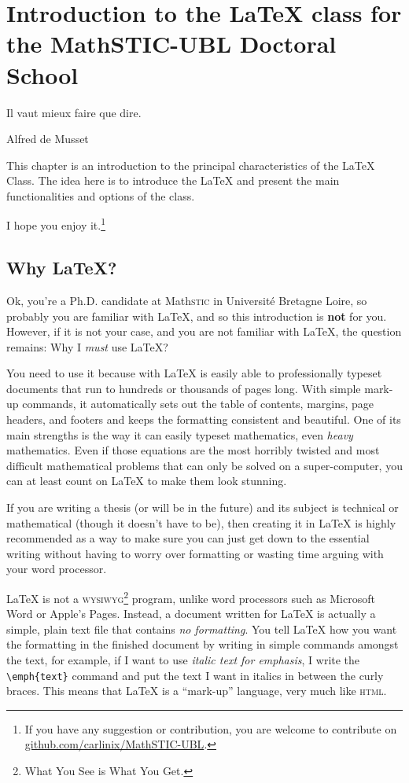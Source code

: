 \chapter{Introduction to the \LaTeX{} class for the MathSTIC-UBL Doctoral School}\label{chap:intro}

\epigraph{Il vaut mieux faire que dire.}{Alfred de Musset}
\minitoc%

This chapter is an introduction to the principal characteristics of the \ublmstic{} \LaTeX{} Class. 
The idea here is to introduce the \LaTeX{} and present the main functionalities and options of the class.


I hope you enjoy it.\footnote{If you have any suggestion or contribution, you are welcome to contribute on \url{github.com/carlinix/MathSTIC-UBL}.}

\section{Why \LaTeX?}\label{sec:why}
Ok, you're a Ph.D. candidate at Math\textsc{stic} in Université Bretagne Loire, so probably you are familiar with \LaTeX{}, and so this introduction is \textbf{not} for you.
However,  if it is not your case, and you are not familiar with \LaTeX{}, the question remains: Why I \emph{must} use \LaTeX\@?

You need to use it because with \LaTeX{} is easily able to professionally typeset documents that run to hundreds or thousands of pages long. 
With simple mark-up commands, it automatically sets out the table of contents, margins, page headers, and footers and keeps the formatting consistent and beautiful. 
One of its main strengths is the way it can easily typeset mathematics, even \emph{heavy} mathematics. 
Even if those equations are the most horribly twisted and most difficult mathematical problems that can only be solved on a super-computer, you can at least count on \LaTeX{} to make them look stunning.

If you are writing a thesis (or will be in the future) and its subject is technical or mathematical (though it doesn't have to be), then creating it in \LaTeX{} is highly recommended as a way to make sure you can just get down to the essential writing without having to worry over formatting or wasting time arguing with your word processor.

\LaTeX{} is not a \textsc{wysiwyg}\footnote{What You See is What You Get.} program, unlike word processors such as Microsoft Word or Apple's Pages. 
Instead, a document written for \LaTeX{} is actually a simple, plain text file that contains \emph{no formatting}. 
You tell \LaTeX{} how you want the formatting in the finished document by writing in simple commands amongst the text, for example, if I want to use \emph{italic text for emphasis}, I write the \verb|\emph{text}| command and put the text I want in italics in between the curly braces. 
This means that \LaTeX{} is a \enquote{mark-up} language, very much like \textsc{html}.

